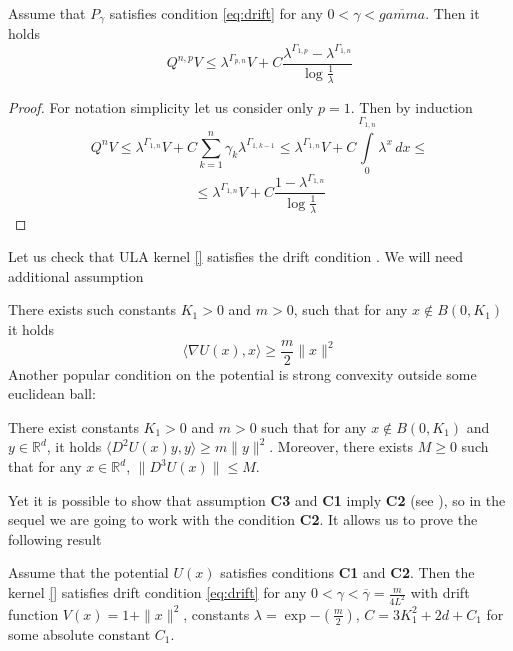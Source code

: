 \documentclass[leqno,11pt,a4paper]{article}
\begin{document}
\begin{lemma}
\label{lem:drift_prod}
 Assume that $P_{\gamma}$ satisfies condition \ref{eq:drift} for any $0 < \gamma < \overline{gamma}$. Then it holds
$$
Q^{n,p}V \leq \lambda^{\Gamma_{p,n}}V + C\frac{\lambda^{\Gamma_{1,p}} - \lambda^{\Gamma_{1,n}}}{\log{\frac{1}{\lambda}}}
$$ 
\end{lemma}
\begin{proof} For notation simplicity let us consider only $p=1$. Then by induction
$$
Q^{n}V \leq \lambda^{\Gamma_{1,n}}V + C \sum\limits_{k=1}^{n}\gamma_k \lambda^{\Gamma_{1,k-1}} \leq \lambda^{\Gamma_{1,n}}V + C \int\limits_{0}^{\Gamma_{1,n}}\lambda^{x}\,dx \leq
$$
$$
\leq \lambda^{\Gamma_{1,n}}V + C\frac{1-\lambda^{\Gamma_{1,n}}}{\log{\frac{1}{\lambda}}}
$$
\end{proof}
Let us check that ULA kernel \ref{} satisfies the drift condition \label{eq:drift}. We will need additional assumption
\par
[{\bf C2}] There exists such constants $K_1 > 0$ and $m > 0$, such that for any $x \notin B(0,K_1)$ it holds
$$
\langle \nabla U(x), x \rangle \geq \frac{m}{2}\|x\|^2
$$
Another popular condition on the potential is strong convexity outside some euclidean ball:
\par
[{\bf C3}] There exist constants $K_1 > 0$ and $m > 0$ such that for any $x \notin B(0,K_1)$ and $y \in \mathbb{R}^d$, it holds $\langle D^2U(x)y,y\rangle \geq m\|y\|^2$. Moreover, there exists $M \geq 0$ such that for any $x \in \mathbb{R}^d$, $\|D^3U(x)\| \leq M$.
\par
Yet it is possible to show that assumption {\bf C3} and {\bf C1} imply {\bf C2} (see \cite[Lemma~14]{brosse:2018:diffusion}), so in the sequel we are going to work with the condition {\bf C2}. It allows us to prove the following result

\begin{lemma} Assume that the potential $U(x)$ satisfies conditions {\bf C1} and {\bf C2}. Then the kernel \ref{} satisfies drift condition \ref{eq:drift} for any $0 < \gamma < \overline{\gamma} = \frac{m}{4L^2}$ with drift function $V(x) = 1 + \|x\|^2$, constants $\lambda = \exp{-\left(\frac{m}{2}\right)}$, $C = 3K_1^2 + 2d + C_1$ for some absolute constant $C_1$.
\end{lemma}
\end{document}
